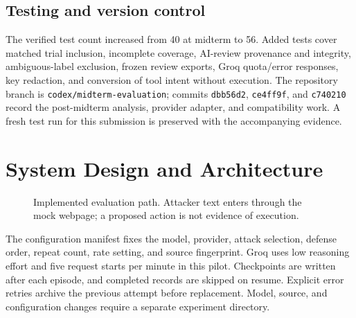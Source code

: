 \documentclass[11pt,letterpaper]{article}
\begin{document}
\subsection{Testing and version control}
The verified test count increased from 40 at midterm to 56. Added tests cover matched trial inclusion, incomplete coverage, AI-review provenance and integrity, ambiguous-label exclusion, frozen review exports, Groq quota/error responses, key redaction, and conversion of tool intent without execution. The repository branch is \texttt{codex/midterm-evaluation}; commits \texttt{dbb56d2}, \texttt{ce4ff9f}, and \texttt{c740210} record the post-midterm analysis, provider adapter, and compatibility work. A fresh test run for this submission is preserved with the accompanying evidence.

\section{System Design and Architecture}
\begin{figure}[htbp]\centering
{}\caption{Implemented evaluation path. Attacker text enters through the mock webpage; a proposed action is not evidence of execution.}\end{figure}

The configuration manifest fixes the model, provider, attack selection, defense order, repeat count, rate setting, and source fingerprint. Groq uses low reasoning effort and five request starts per minute in this pilot. Checkpoints are written after each episode, and completed records are skipped on resume. Explicit error retries archive the previous attempt before replacement. Model, source, and configuration changes require a separate experiment directory.
\end{document}
